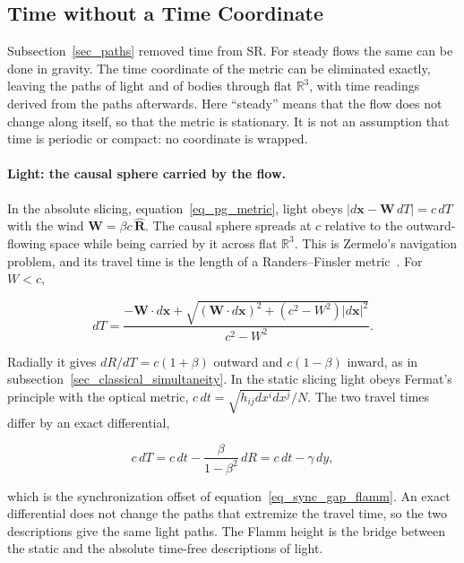 \documentclass[anonymous]{iopjournal}
\begin{document}
\subsection{Time without a Time Coordinate}\label{sec_time_elimination}

Subsection~\ref{sec_paths} removed time from SR. For steady flows the same can be done in gravity. The time coordinate of the metric can be eliminated exactly, leaving the paths of light and of bodies through flat $\mathbb{R}^3$, with time readings derived from the paths afterwards. Here ``steady'' means that the flow does not change along itself, so that the metric is stationary. It is not an assumption that time is periodic or compact: no coordinate is wrapped.

\paragraph{Light: the causal sphere carried by the flow.} In the absolute slicing, equation~\eqref{eq_pg_metric}, light obeys $|d\mathbf{x}-\mathbf{W}\,dT|=c\,dT$ with the wind $\mathbf{W}=\beta c\,\hat{\mathbf{R}}$. The causal sphere spreads at $c$ relative to the outward-flowing space while being carried by it across flat $\mathbb{R}^3$. This is Zermelo's navigation problem, and its travel time is the length of a Randers--Finsler metric~\cite{GibbonsZermelo2009}. For $W<c$,

\begin{equation}\label{eq_zermelo_time}
    dT=\frac{-\mathbf{W}\cdot d\mathbf{x}+\sqrt{\left(\mathbf{W}\cdot d\mathbf{x}\right)^2+\left(c^2-W^2\right)|d\mathbf{x}|^2}}{c^2-W^2}.
\end{equation}

Radially it gives $dR/dT=c(1+\beta)$ outward and $c(1-\beta)$ inward, as in subsection~\ref{sec_classical_simultaneity}. In the static slicing light obeys Fermat's principle with the optical metric, $c\,dt=\sqrt{h_{ij}dx^idx^j}/N$. The two travel times differ by an exact differential,

\begin{equation}\label{eq_randers_fermat}
    c\,dT=c\,dt-\frac{\beta}{1-\beta^2}\,dR=c\,dt-\gamma\,dy ,
\end{equation}

which is the synchronization offset of equation~\eqref{eq_sync_gap_flamm}. An exact differential does not change the paths that extremize the travel time, so the two descriptions give the same light paths. The Flamm height is the bridge between the static and the absolute time-free descriptions of light.
\end{document}
